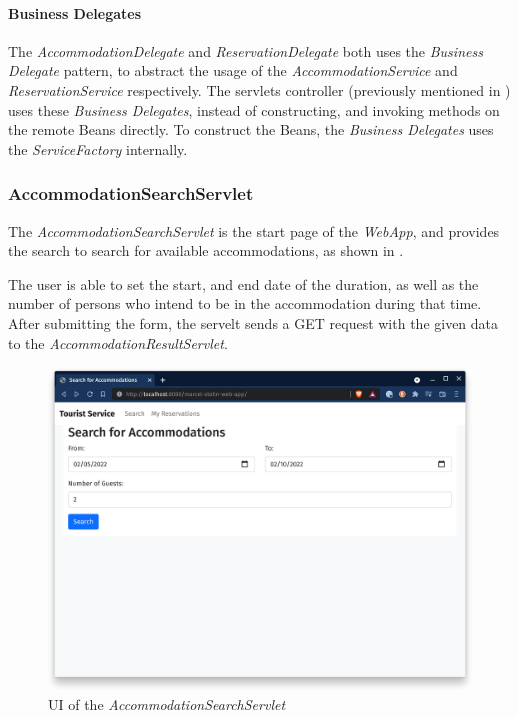 \paragraph{Business Delegates}
The \textit{AccommodationDelegate} and \textit{ReservationDelegate} both uses the \textit{Business Delegate} pattern, to abstract the usage of the \textit{AccommodationService} and \textit{ReservationService} respectively. The servlets controller (previously mentioned in ) uses these \textit{Business Delegates}, instead of constructing, and invoking methods on the remote Beans directly. To construct the Beans, the \textit{Business Delegates} uses the \textit{ServiceFactory} internally.

\newpage
\subsubsection{AccommodationSearchServlet}\label{sec:02_design_web_search}
The \textit{AccommodationSearchServlet} is the start page of the \textit{WebApp}, and provides the search to search for available accommodations, as shown in .

The user is able to set the start, and end date of the duration, as well as the number of persons who intend to be in the accommodation during that time.
After submitting the form, the servelt sends a GET request with the given data to the \textit{AccommodationResultServlet}.
\begin{figure}[h]
\centering
\includegraphics[scale=0.14]{images/02_design/web-app-search}
\caption{UI of the \textit{AccommodationSearchServlet}}
\label{fig:02_design_web_search_page}
\end{figure}

